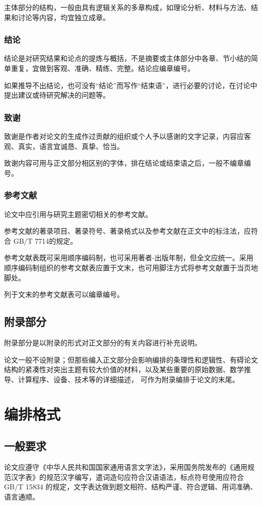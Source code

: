 主体部分的结构，一般由具有逻辑关系的多章构成，如理论分析、材料与方法、结果和讨论等内容，均宜独立成章。

\subsection{结论}
结论是对研究结果和论点的提炼与概括，不是摘要或主体部分中各章、节小结的简单重复，宜做到客观、准确、精练、完整。结论应编章编号。

如果推导不出结论，也可没有“结论”而写作“结束语”，进行必要的讨论，在讨论中提出建议或待研究解决的问题等。

\subsection{致谢}
致谢是作者对论文的生成作过贡献的组织或个人予以感谢的文字记录，内容应客观、真实，语言宜诚恳、真挚、恰当。

致谢内容可用与正文部分相区别的字体，排在结论或结束语之后，一般不编章编号。

\subsection{参考文献}
论文中应引用与研究主题密切相关的参考文献。

参考文献的著录项目、著录符号、著录格式以及参考文献在正文中的标注法，应符合 GB/T 7714的规定。

参考文献表既可采用顺序编码制，也可采用著者-出版年制，但全文应统一。采用顺序编码制组织的参考文献表应置于文末，也可用脚注方式将参考文献置于当页地脚处。

列于文末的参考文献表可以编章编号。

\section{附录部分}
附录部分是以附录的形式对正文部分的有关内容进行补充说明。

论文一般不设附录；但那些编入正文部分会影响编排的条理性和逻辑性、有碍论文结构的紧凑性对突出主题有较大价值的材料，以及某些重要的原始数据、数学推导、计算程序、设备、技术等的详细描述， 可作为附录编排于论文的末尾。


\chapter{编排格式}
\section{一般要求}
论文应遵守《中华人民共和国国家通用语言文字法》，采用国务院发布的《通用规范汉字表》的规范汉字编写，遣词造句应符合汉语语法，标点符号使用应符合 GB/T 15834 的规定，文字表达做到题文相符、结构严谨、符合逻辑、用词准确、语言通顺。

